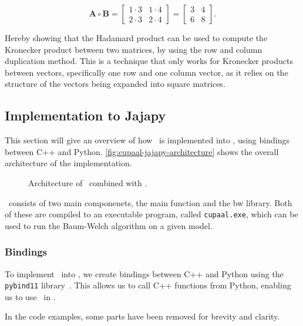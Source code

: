 \begin{equation}
    \mathbf{A} \circ \mathbf{B} = \begin{bmatrix}
        1 \cdot 3 & 1 \cdot 4 \\
        2 \cdot 3 & 2 \cdot 4
    \end{bmatrix} = \begin{bmatrix}
        3 & 4 \\
        6 & 8
    \end{bmatrix}.
\end{equation}


Hereby showing that the Hadamard product can be used to compute the Kronecker product between two matrices, by using the row and column duplication method.
This is a technique that only works for Kronecker products between vectors, specifically one row and one column vector, as it relies on the structure of the vectors being expanded into square matrices.

\subsection{Implementation to Jajapy}\label{subsec:implementation-to-jajapy}
This section will give an overview of how \Cupaal\ is implemented into \Jajapy, using bindings between C++ and Python.
\autoref{fig:cupaal-jajapy-architecture} shows the overall architecture of the implementation.

\begin{figure}[htb!]
    \centering
    
    \caption{Architecture of \Cupaal\ combined with \Jajapy.}
    \label{fig:cupaal-jajapy-architecture}
\end{figure}

\Cupaal\ consists of two main componenets, the main function and the \gls{bw} library.
Both of these are compiled to an executable program, called \texttt{cupaal.exe}, which can be used to run the Baum-Welch algorithm on a given model.

\subsubsection{Bindings}\label{subsubsec:bindings}
To implement \Cupaal\ into \Jajapy, we create bindings between C++ and Python using the \texttt{pybind11} library~\cite{pybind11github}.
This allows us to call C++ functions from Python, enabling us to use \Cupaal\ in \Jajapy.

In the code examples, some parts have been removed for brevity and clarity.


